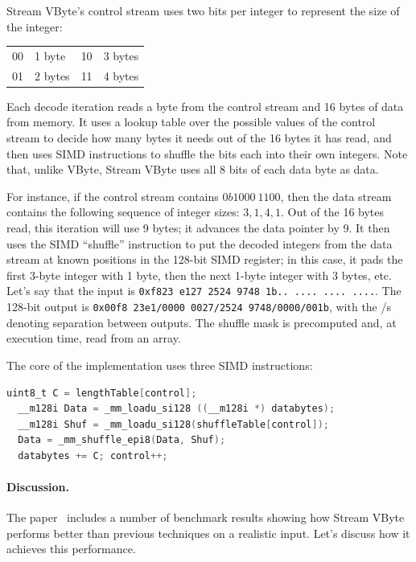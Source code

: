 \documentclass[a4paper]{report}
\begin{document}
Stream VByte's control stream uses two bits per integer to represent the size of the integer:
\begin{center}
\vspace*{-1em}
\begin{tabular}{ll@{~~~~~~~~}ll}
00 & 1 byte & 10 & 3 bytes\\
01 & 2 bytes & 11 & 4 bytes
\end{tabular}
\end{center}

Each decode iteration reads a byte from the control stream and 16 bytes of data from memory.
It uses a lookup table over the possible values of the control stream to decide how many
bytes it needs out of the 16 bytes it has read, and then uses SIMD instructions to shuffle
the bits each into their own integers. Note that, unlike VByte, Stream VByte uses all 8 bits
of each data byte as data.

For instance, if the control stream contains $0b1000~1100$, then the data stream
contains the following sequence of integer sizes: $3, 1, 4, 1$. Out of the 16 bytes read,
this iteration will use 9 bytes; it advances the data pointer by 9. It then uses the SIMD
``shuffle'' instruction to put the decoded integers from the data stream at known positions in the
128-bit SIMD register; in this case, it pads the first 3-byte integer with 1 byte, then
the next 1-byte integer with 3 bytes, etc. Let's say that the input is
{\tt 0xf823~e127~2524~9748~1b..~....~....~....}. The 128-bit output is
{\tt 0x00f8~23e1/0000~0027/2524 9748/0000/001b}, with the /s denoting separation
between outputs. The shuffle mask is precomputed and, at
execution time, read from an array.

The core of the implementation uses three SIMD instructions:
\begin{lstlisting}[language=C]
  uint8_t C = lengthTable[control];
  __m128i Data = _mm_loadu_si128 ((__m128i *) databytes);
  __m128i Shuf = _mm_loadu_si128(shuffleTable[control]);
  Data = _mm_shuffle_epi8(Data, Shuf);
  databytes += C; control++;
\end{lstlisting}

\paragraph{Discussion.} The paper~\cite{LEMIRE20181} includes a number of benchmark results
showing how Stream VByte performs better than previous techniques on a realistic input.
Let's discuss how it achieves this performance.
\end{document}
